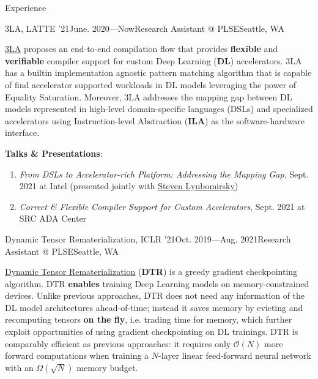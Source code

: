 \documentclass{resume}
\newcommand{\myul}[2][blue]{\setulcolor{#1}\ul{#2}\setulcolor{blue}}
\begin{document}
    \begin{rSection}{Experience}
        \begin{rSubsection}{3LA, LATTE '21}{June. 2020---Now}{Research Assistant @ PLSE}{Seattle, WA}
            \item \href{https://capra.cs.cornell.edu/latte21/paper/30.pdf}{\color{blue} \myul{3LA}} proposes an end-to-end compilation flow that provides \textbf{flexible} and \textbf{verifiable} compiler support for custom Deep Learning (\textbf{DL}) accelerators. 3LA has a builtin implementation agnostic pattern matching algorithm that is capable of find accelerator supported workloads in DL models leveraging the power of Equality Saturation. Moreover, 3LA addresses the mapping gap between DL models represented in high-level domain-specific languages (DSLs) and specialized accelerators using Instruction-level Abstraction (\textbf{ILA}) as the software-hardware interface.
            \item \textbf{Talks \& Presentations}:
            \vspace{-5pt}
                \begin{enumerate}
                    \setlength{\itemsep}{1pt}
                    \setlength{\parskip}{0pt}
                    \setlength{\parsep}{0pt}
                    \item \textit{From DSLs to Accelerator-rich Platform: Addressing the Mapping Gap}, Sept. 2021 at Intel (presented jointly with \href{https://homes.cs.washington.edu/~sslyu/}{\color{blue} \myul {Steven Lyubomirsky}})
                    \item \textit{Correct \& Flexible Compiler Support for Custom Accelerators}, Sept. 2021 at SRC ADA Center
                \end{enumerate} 
        \end{rSubsection}
        \vspace{-5pt}
        \begin{rSubsection}{Dynamic Tensor Rematerialization, ICLR '21}{Oct. 2019---Aug. 2021}{Research Assistant @ PLSE}{Seattle, WA}
            \item \href{https://github.com/uwsampl/dtr-prototype}{\color{blue} \myul{Dynamic Tensor Rematerialization}} (\textbf{DTR}) is a greedy gradient checkpointing algorithm. DTR \textbf{enables} training Deep Learning models on memory-constrained devices. Unlike previous approaches, DTR does not need any information of the DL model architectures ahead-of-time; instead it saves memory by evicting and recomputing tensors \textbf{on the fly}, i.e. trading time for memory, which further exploit opportunities of using gradient checkpointing on DL trainings. DTR is comparably efficient as previous approaches: it requires only $\mathcal{O}(N)$ more forward computations when training a $N$-layer linear feed-forward neural network with an $\Omega(\sqrt{N})$ memory budget.

\end{rSubsection}
\end{rSection}
\end{document}
